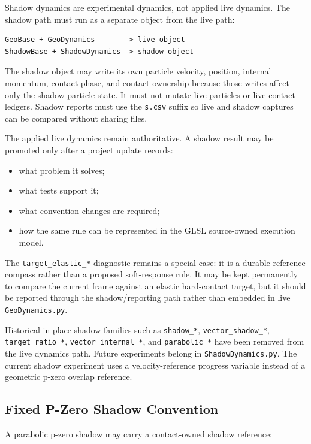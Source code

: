 Shadow dynamics are experimental dynamics, not applied live dynamics.  The
shadow path must run as a separate object from the live path:

\begin{verbatim}
GeoBase + GeoDynamics       -> live object
ShadowBase + ShadowDynamics -> shadow object
\end{verbatim}

The shadow object may write its own particle velocity, position, internal
momentum, contact phase, and contact ownership because those writes affect only
the shadow particle state.  It must not mutate live particles or live
contact ledgers.  Shadow reports must use the \texttt{s.csv} suffix so live
and shadow captures can be compared without sharing files.

The applied live dynamics remain authoritative.  A shadow result may be
promoted only after a project update records:

\begin{itemize}[leftmargin=*]
    \item what problem it solves;
    \item what tests support it;
    \item what convention changes are required;
    \item how the same rule can be represented in the GLSL source-owned
    execution model.
\end{itemize}

The \texttt{target\_elastic\_*} diagnostic remains a special case: it is a
durable reference compass rather than a proposed soft-response rule.  It may be
kept permanently to compare the current frame against an elastic hard-contact
target, but it should be reported through the shadow/reporting path rather
than embedded in live \texttt{GeoDynamics.py}.

Historical in-place shadow families such as \texttt{shadow\_*},
\texttt{vector\_shadow\_*}, \texttt{target\_ratio\_*},
\texttt{vector\_internal\_*}, and \texttt{parabolic\_*} have been removed from
the live dynamics path.  Future experiments belong in
\texttt{ShadowDynamics.py}.  The current shadow experiment uses a
velocity-reference progress variable instead of a geometric p-zero overlap
reference.

\subsection{Fixed P-Zero Shadow Convention}

A parabolic p-zero shadow may carry a contact-owned shadow reference:

